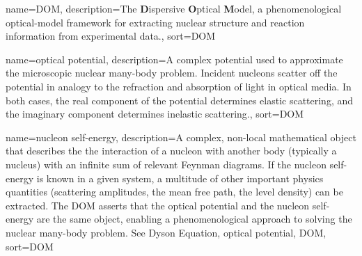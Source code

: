 \makeglossaries

{
    name={DOM},
    description={The \textbf{D}ispersive \textbf{O}ptical \textbf{M}odel, a phenomenological
optical-model framework for extracting nuclear structure and reaction information from experimental data.},
    sort={DOM}
}

{
    name={optical potential},
    description={A complex potential used to approximate the microscopic nuclear
    many-body problem. Incident nucleons scatter off the potential in analogy
    to the refraction and absorption of light in optical media.
    In both cases, the real component of the potential determines
    elastic scattering, and the imaginary component determines inelastic
    scattering.},
    sort={DOM}
}

{
    name={nucleon self-energy},
    description={A complex, non-local mathematical object that describes the 
    the interaction of a nucleon with another body (typically a nucleus) with an
    infinite sum of relevant Feynman diagrams. If the nucleon self-energy is known in a
    given system, a multitude of other important physics quantities
    (scattering amplitudes, the mean free path, the level density) can be
    extracted. The DOM asserts that the optical
    potential and the nucleon self-energy are the same object, enabling a
    phenomenological approach to solving the nuclear many-body problem.
    See \Gls{Dyson Equation}, \Gls{optical potential}, \Gls{DOM}},
    sort={DOM}
}
